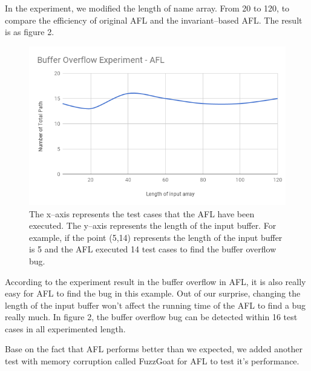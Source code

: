 \documentclass[sigplan,10pt,review = false]{acmart}\settopmatter{printfolios=true,printccs=false,printacmref=false}
\begin{document}
In the experiment, we modified the length of name array. From 20 to 120, to compare the efficiency of original AFL and the invariant--based AFL. The result is as figure 2.

\begin{figure}[h]
\centering
\includegraphics[scale=.4]{buffer_AFL}
\caption{The x--axis represents the test cases that the AFL have been executed. The y--axis represents the length of the input buffer. For example, if the point (5,14) represents the length of the input buffer is 5 and the AFL executed 14 test cases to find the buffer overflow bug.}
\end{figure}

According to the experiment result in the buffer overflow in AFL, it is also really easy for AFL to find the bug in this example. Out of our surprise, changing the length of the input buffer won't affect the running time of the AFL to find a bug really much. In figure 2, the buffer overflow bug can be detected within 16 test cases in all experimented length.

Base on the fact that AFL performs better than we expected, we added another test with memory corruption called FuzzGoat \cite{fgaddress} for AFL to test it's performance.
\end{document}
